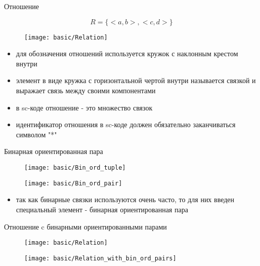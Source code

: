 \begin{frame}[shrink=20]{Отношение}
  \begin{center}
    \[ R = \{ <a, b>, <c, d> \} \]
    
    \objeqv

    \begin{figure}
      \texttt{[image: basic/Relation]}
    \end{figure}
  \end{center}

  \begin{itemize}
  \item для обозначения отношений используется кружок с наклонным
    крестом внутри
  \item элемент в виде кружка с горизонтальной чертой внутри
    называется связкой и выражает связь между своими компонентами
  \item в sc-коде отношение - это множество связок
  \item идентификатор отношения в sc-коде должен обязательно
    заканчиваться символом "*"
  \end{itemize}
\end{frame}

\begin{frame}{Бинарная ориентированная пара}
  \begin{center}
    \begin{figure}
      \texttt{[image: basic/Bin\_ord\_tuple]}
    \end{figure}

    \objeqv

    \begin{figure}
      \texttt{[image: basic/Bin\_ord\_pair]}
    \end{figure}
  \end{center}

  \begin{itemize}
  \item так как бинарные связки используются очень часто, то для них
    введен специальный элемент - бинарная ориентированная пара
  \end{itemize}
\end{frame}

\begin{frame}{Отношение c бинарными ориентированными парами}
  \begin{center}
    \begin{figure}
      \texttt{[image: basic/Relation]}
    \end{figure}
    
    \objeqv

    \begin{figure}
      \texttt{[image: basic/Relation\_with\_bin\_ord\_pairs]}
    \end{figure}
  \end{center}
\end{frame}

